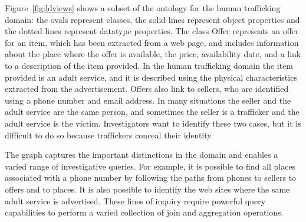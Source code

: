 Figure~\ref{fig:ldviews} shows a subset of the ontology for the human trafficking domain: the ovals represent classes, the solid lines represent object properties and the dotted lines represent datatype properties.
The class Offer represents an offer for an item, which has been extracted from a web page, and includes information about the place where the offer is available, the price, availability date, and a link to a description of the item provided.
In the human trafficking domain the item provided is an adult service, and it is described using the physical characteristics extracted from the advertisement. 
Offers also link to sellers, who are identified using a phone number and email address.
In many situations the seller and the adult service are the same person, and sometimes the seller is a trafficker and the adult service is the victim.
Investigators want to identify these two cases, but it is difficult to do so because traffickers conceal their identity.

The graph captures the important distinctions in the domain and enables a varied range of investigative queries.
For example, it is possible to find all places associated with a phone number by following the paths from phones to sellers to offers and to places.
It is also possible to identify the web sites where the same adult service is advertised.
These lines of inquiry require powerful query capabilities to perform a varied collection of join and aggregation operations.